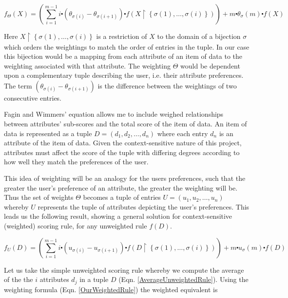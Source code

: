 \begin{equation}\label{WeightedRule}	
	f_\Theta (X) = \left(\sum_{i=1}^{m-1} i\centerdot (\theta_{\sigma{(i)}} - \theta_{\sigma{(i+1)}})\centerdot f(X\upharpoonright\left\{\sigma(1),\dots,\sigma(i)\right\})\right) + m \centerdot \theta_\sigma{(m)} \centerdot f(X)
\end{equation}

Here $X\upharpoonright\left\{\sigma(1),\dots,\sigma(i)\right\}$ is a restriction of $X$ to the domain of a bijection $\sigma$ which orders the weightings to match the order of entries in the tuple. In our case this bijection would be a mapping from each attribute of an item of data to the weighting associated with that attribute. The weighting $\Theta$ would be dependent upon a complementary tuple describing the user, i.e. their attribute preferences. The term $(\theta_{\sigma{(i)}} - \theta_{\sigma{(i+1)}})$ is the difference between the weightings of two consecutive entries. 

Fagin and Wimmers' equation allows me to include weighed relationships between attributes' sub-scores and the total score of the item of data. An item of data is represented as a tuple $ D = (d_1, d_2, \dots, d_n)$ where each entry $d_n$ is an attribute of the item of data. Given the context-sensitive nature of this project, attributes must affect the score of the tuple with differing degrees according to how well they match the preferences of the user. 

This idea of weighting will be an analogy for the users preferences, such that the greater the user's preference of an attribute, the greater the weighting will be. Thus the set of weights $\Theta$ becomes a tuple of entries $ U = (u_1, u_2, \dots, u_n)$ whereby $U$ represents the tuple of attributes depicting the user's preferences. This leads us the following result, showing a general solution for context-sensitive (weighted) scoring rule, for any unweighted rule $f(D)$.

\begin{equation}\label{OurWeightedRule}	
	f_U (D) = \left(\sum_{i=1}^{m-1} i\centerdot (u_{\sigma{(i)}} - u_{\sigma{(i+1)}})\centerdot f(D\upharpoonright\left\{\sigma(1),\dots,\sigma(i)\right\})\right) + m \centerdot u_\sigma{(m)} \centerdot f(D)
\end{equation}

Let us take the simple unweighted scoring rule whereby we compute the average of the the $i$ attributes $d_j$ in a tuple $D$ (Eqn. \ref{AverageUnweightedRule}). Using the weighting formula (Eqn. \ref{OurWeightedRule}) the weighted equivalent is

